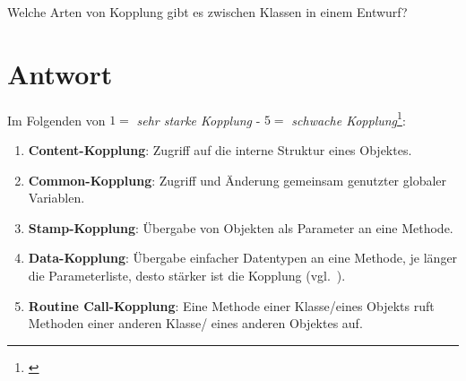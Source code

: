 Welche Arten von Kopplung gibt es zwischen Klassen in einem Entwurf?

\section*{Antwort}

Im Folgenden von $1=$ \textit{sehr starke Kopplung} - $5 =$ \textit{schwache Kopplung}\footnote{
\cite[33 ff.]{Mye75}
}:

\begin{enumerate}
    \item \textbf{Content-Kopplung}: Zugriff auf die interne Struktur eines Objektes.
    \item \textbf{Common-Kopplung}: Zugriff und Änderung gemeinsam genutzter globaler Variablen.
    \item \textbf{Stamp-Kopplung}: Übergabe von Objekten als Parameter an eine Methode.
    \item \textbf{Data-Kopplung}: Übergabe einfacher Datentypen an eine Methode, je länger die Parameterliste, desto stärker ist die Kopplung (vgl.~\cite[75]{Wed09b}).
    \item \textbf{Routine Call-Kopplung}: Eine Methode einer Klasse/eines Objekts ruft Methoden einer anderen Klasse/ eines anderen Objektes auf.
\end{enumerate}